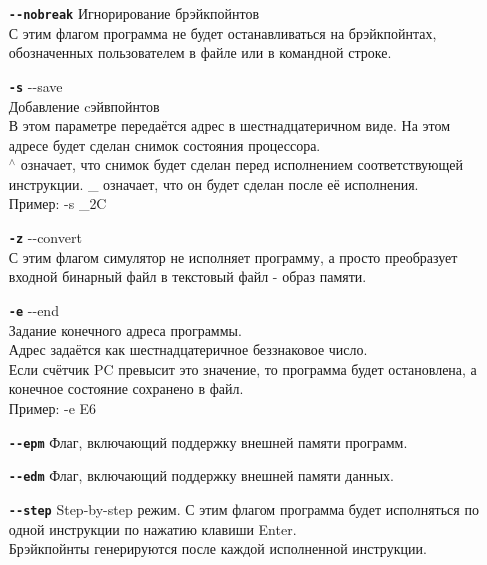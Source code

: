 \begin{enumerate}
	\item[{\tt\bf {-}-nobreak}]
	Игнорирование брэйкпойнтов \\
	С этим флагом программа не будет останавливаться на брэйкпойнтах, обозначенных пользователем в файле или в командной строке.
	
	\item[{\tt\bf -s}] {-}-save \\
	Добавление cэйвпойнтов \\
	В этом параметре передаётся адрес в шестнадцатеричном виде. На этом адресе будет сделан снимок состояния процессора. \\
	$^\wedge$ означает, что снимок будет сделан перед исполнением соответствующей инструкции. \_ означает, что он будет сделан после её исполнения. \\
	Пример: -s {\_}2C
	
	\item[{\tt\bf -z}] {-}-convert \\
	С этим флагом симулятор не исполняет программу, а просто преобразует входной бинарный файл в текстовый файл - образ памяти.\\

	\item[{\tt\bf -e}] {-}-end \\
	Задание конечного адреса программы. \\
	Адрес задаётся как шестнадцатеричное беззнаковое число. \\
	Если счётчик PC превысит это значение, то программа будет остановлена, а конечное состояние сохранено в файл. \\
	Пример: -e E6
	
	\item[{\tt\bf {-}-epm}]
	Флаг, включающий поддержку внешней памяти программ.
	
	\item[{\tt\bf {-}-edm}]
	Флаг, включающий поддержку внешней памяти данных.
	
	\item[{\tt\bf {-}-step}]
	Step-by-step режим. С этим флагом программа будет исполняться по одной инструкции по нажатию клавиши Enter.\\
	Брэйкпойнты генерируются после каждой исполненной инструкции.
	
\end{enumerate}

